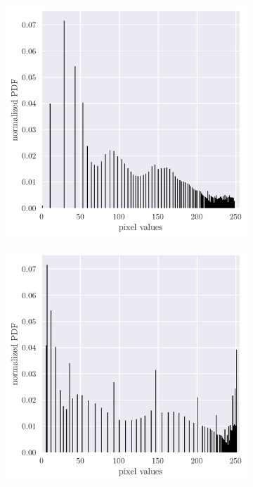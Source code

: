 \documentclass[12pt,a4paper]{article}
\begin{document}
\begin{figure}[htb]
\begin{subfigure}[h!]{0.24\textwidth}
		\caption{}
		\label{fig:cs-hist}
	\end{subfigure}
	\begin{subfigure}[h!]{0.24\textwidth}
		\centering
		\includegraphics[width=\textwidth]{histeq_hist.png}
		\caption{}
		\label{fig:histeq-hist}
	\end{subfigure}
	\begin{subfigure}[h!]{0.24\textwidth}
		\centering
		\includegraphics[width=\textwidth]{adapteq_hist.png}
		\caption{}
		\label{fig:adapteq-hist}
	\end{subfigure}
	

\end{figure}
\end{document}

